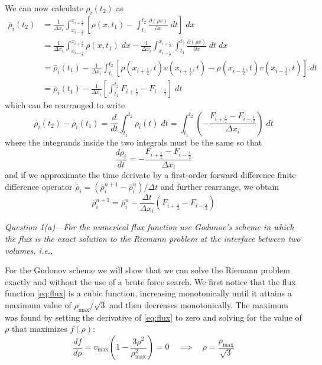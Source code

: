 \documentclass[11pt]{article}
\begin{document}
We can now calculate $\rho_i(t_2)$ as
\begin{align*}
\bar{\rho}_i(t_2) &=
	\frac{1}{\Delta x_i} \int_{x_{i-\frac{1}{2}}}^{x_{i+\frac{1}{2}}} \left[ \rho(x,t_1) - \int_{t_1}^{t_2} \frac{\partial(\rho v)}{\partial x} \; dt \right] \; dx \\
	&= \frac{1}{\Delta x_i} \int_{x_{i-\frac{1}{2}}}^{x_{i+\frac{1}{2}}} \rho(x,t_1) \; dx - \frac{1}{\Delta x_i} \int_{x_{i-\frac{1}{2}}}^{x_{i+\frac{1}{2}}} \int_{t_1}^{t_2} \frac{\partial(\rho v)}{\partial x} \; dt \; dx \\
	&= \bar{\rho}_i(t_1) - \frac{1}{\Delta x_i} \int_{t_1}^{t_2} \left[ \rho(x_{i+\frac{1}{2}}, t) v(x_{i+\frac{1}{2}}, t) - \rho(x_{i-\frac{1}{2}}, t) v(x_{i-\frac{1}{2}}, t) \right] \; dt \\
	&= \bar{\rho}_i(t_1) - \frac{1}{\Delta x_i} \left[ \int_{t_1}^{t_2} F_{i+\frac{1}{2}} - F_{i-\frac{1}{2}} \right] \; dt
\end{align*}
which can be rearranged to write
\begin{equation*}
	\bar{\rho}_i(t_2) - \bar{\rho}_i(t_1) = \frac{d}{dt} \int_{t_1}^{t_2} \rho_i(t) \; dt = \int_{t_1}^{t_2} \left( - \frac{F_{i+\frac{1}{2}} - F_{i-\frac{1}{2}}}{\Delta x_i} \right) \; dt
\end{equation*}
where the integrands inside the two integrals must be the same so that
\begin{equation*}
	\frac{d \bar{\rho}_i}{dt} = - \frac{F_{i+\frac{1}{2}} - F_{i-\frac{1}{2}}}{\Delta x_i}
\end{equation*}
and if we approximate the time derivate by a first-order forward difference finite difference operator $\dot{\bar{\rho}}_i = (\bar{\rho}_i^{n+1} - \bar{\rho}_i^n)/\Delta t$ and further rearrange, we obtain
\begin{equation}
	\bar{\rho}_i^{n+1} = \bar{\rho}_i^n - \frac{\Delta t}{\Delta x_i} \left( F_{i+\frac{1}{2}} - F_{i-\frac{1}{2}} \right) 
\end{equation}

\begin{tcolorbox}
  \textit{Question 1(a)---For the numerical flux function use Godunov’s scheme in which the flux is the exact solution to the Riemann problem at the interface between two volumes, i.e.,}
\end{tcolorbox}

For the Gudonov scheme we will show that we can solve the Riemann problem exactly and without the use of a brute force search. We first notice that the flux function \eqref{eq:flux} is a cubic function, increasing monotonically until it attains a maximum value of $\rho_\mathrm{max}/\sqrt{3}$ and then decreases monotonically. The maximum was found by setting the derivative of \eqref{eq:flux} to zero and solving for the value of $\rho$ that maximizes $f(\rho)$:
\begin{equation*}
  \frac{df}{d\rho} = v_\mathrm{max} \left( 1 - \frac{3\rho^2}{\rho_\mathrm{max}^2} \right) = 0 \quad \implies \quad \rho = \frac{\rho_\mathrm{max}}{\sqrt{3}}
\end{equation*}
\end{document}
